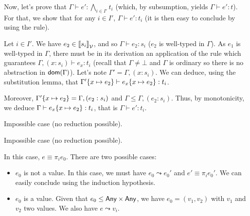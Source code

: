\documentclass[a4paper]{article}
\theoremstyle{definition}
\begin{document}
\begin{description}
\begin{itemize}
            Now, let's prove that $\Gamma \vdash e':\bigwedge_{i\in I'} t_i$ (which, by subsumption,
            yields $\Gamma \vdash e': t$). For that, we show that for any $i\in I'$, $\Gamma \vdash e':t_i$
            (it is then easy to conclude by using the  rule).

            Let $i\in I'$. We have $e_2\in{\llbracket s_i \rrbracket}_{\mathcal{V}}$, and so $\Gamma \vdash e_2:s_i$ ($e_2$ is well-typed in $\Gamma$).
            As $e_1$ is well-typed in $\Gamma$, there must be in its derivation an application of the rule 
            which guarantees $\Gamma,(x:s_i) \vdash e_x:t_i$ (recall that $\Gamma \neq \bot$ and $\Gamma$ is ordinary so there is no abstraction in $\textsf{dom}(\Gamma)$).
            Let's note $\Gamma'=\Gamma,(x:s_i)$.
            We can deduce, using the substitution lemma, that $\Gamma'\{x \mapsto e_2\} \vdash e_x\{x \mapsto e_2\}: t_i$.
           
            Moreover, $\Gamma'\{x \mapsto e_2\} = \Gamma,(e_2:s_i)$ and $\Gamma \leq \Gamma,(e_2:s_i)$.
            Thus, by monotonicity, we deduce $\Gamma \vdash e_x\{x \mapsto e_2\}: t_i$,
            that is $\Gamma \vdash e': t_i$.
          \end{itemize}
          \item[\Rule{Abs+}] Impossible case (no reduction possible).
          \item[\Rule{Abs-}] Impossible case (no reduction possible).
          \item[\Rule{Proj}] In this case, $e\equiv \pi_i e_0$. There are two possible cases:
          \begin{itemize}
            \item $e_0$ is not a value. In this case, we must have $e_0\leadsto e_0'$
            and $e'\equiv \pi_i e_0'$. We can easily conclude using the induction hypothesis.
            \item $e_0$ is a value.
            Given that $e_0 \leq \textsf{Any}\times \textsf{Any}$, we have $e_0 = (v_1,v_2)$ with $v_1$ and $v_2$ two values.
            We also have $e \leadsto v_i$.


\end{itemize}
\end{description}
\end{document}
